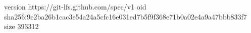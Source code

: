 version https://git-lfs.github.com/spec/v1
oid sha256:9e2ba26b1cac3e54a24a5cfc16e031ed7b5f9f368e71b0a02e4a9a47bbb833f7
size 393312
